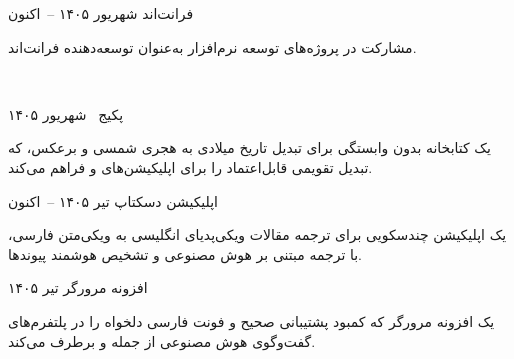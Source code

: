 
\begin{cventries}

\cventry
{فرانت‌اند}
{\href{https://droppgroup.com}{}}
{} %
{شهریور ۱۴۰۵ --\ اکنون}
{
	\begin{cvitems}
		\item {مشارکت در پروژه‌های توسعه نرم‌افزار به‌عنوان توسعه‌دهنده فرانت‌اند.}
    \item {}
		\item {}‍
	\end{cvitems}
}

\cventry
{پکیج~}
{\href{https://www.npmjs.com/package/iran-estehlal}{}}
{}
{شهریور ۱۴۰۵}
{
  \begin{cvitems}
    \item {یک کتابخانه بدون وابستگی برای تبدیل تاریخ میلادی به هجری شمسی و برعکس، که تبدیل تقویمی قابل‌اعتماد را برای اپلیکیشن‌های  و  فراهم می‌کند.}
    \item {}
  \end{cvitems}
}

\cventry
{اپلیکیشن دسکتاپ}
{\href{https://github.com/wikimediairan/Perseus}{}}
{}
{تیر ۱۴۰۵ --\ اکنون}
{
  \begin{cvitems}
    \item {یک اپلیکیشن چندسکویی برای ترجمه مقالات ویکی‌پدیای انگلیسی به ویکی‌متن فارسی، با ترجمه مبتنی بر هوش مصنوعی و تشخیص هوشمند پیوندها.}
    \item {}
  \end{cvitems}
}

\cventry
{افزونه مرورگر}
{\href{https://github.com/NedaMani/RTLeeBOT}{}}
{}
{تیر ۱۴۰۵}
{
  \begin{cvitems}
    \item {یک افزونه مرورگر که کمبود پشتیبانی صحیح  و فونت فارسی دلخواه را در پلتفرم‌های گفت‌وگوی هوش مصنوعی از جمله  و  برطرف می‌کند.}
    \item {}
  \end{cvitems}
}


\end{cventries}
